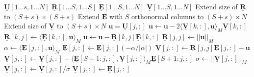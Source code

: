 \begin{algorithmic}
\Require $\mathbf{\underline{U}}[1 \dots s, 1 \dots N]$ 
\Require $\mathbf{\underline{R}}[1 \dots S, 1 \dots S]$  
\Require $\mathbf{\underline{E}}[1 \dots S, 1 \dots N]$ 
\Require $\mathbf{\underline{V}}[1 \dots S, 1 \dots N]$ 
\State Extend size of $\mathbf{\underline{R}}$ to $(S + s) \times (S + s)$
\State Extend $\mathbf{\underline{E}}$ with $S$ orthonormal columns to $(S + s) \times N$
\State Extend size of $\mathbf{\underline{V}}$ to $(S + s) \times N$
    \State $\mathbf{u} = \mathbf{\underline{U}}[j, :]$
        \State $\mathbf{u} \leftarrow \mathbf{u} - 2 \langle \mathbf{\underline{V}}[k, :], \mathbf{u} \rangle_M \mathbf{\underline{V}}[k, :]$
        \State $\mathbf{\underline{R}}[k, j] \leftarrow \langle \mathbf{\underline{E}}[k, :], \mathbf{u} \rangle_M$
        \State $\mathbf{u} \leftarrow \mathbf{u} - \mathbf{\underline{R}}[k, j] \mathbf{\underline{E}}[k, :]$
    \EndFor
    \State $\mathbf{\underline{R}}[j, j] \leftarrow ||\mathbf{u}||_M$
    \State $\alpha \leftarrow \langle \mathbf{\underline{E}}[j, :], \mathbf{u} \rangle_M$
        \State $\mathbf{\underline{E}}[j, :] \leftarrow \mathbf{\underline{E}}[j, :] (-\alpha / |\alpha|)$
    \EndIf 
    \State $\mathbf{\underline{V}}[j, :] \leftarrow \mathbf{\underline{R}}[j, j] \mathbf{\underline{E}}[j, :] - \mathbf{u}$
    \State $\mathbf{\underline{V}}[j, :] \leftarrow \mathbf{\underline{V}}[j, :] - \langle \mathbf{\underline{E}}[S+1:j, :], \mathbf{\underline{V}}[j, :] \rangle_M \mathbf{\underline{E}}[S+1:j, :]$ 
    \State $\sigma \leftarrow ||\mathbf{\underline{V}}[j, :]||_M$
        \State $\mathbf{\underline{V}}[j, :] \leftarrow \mathbf{\underline{V}}[j, :] / \sigma$
    \Else
        \State $\mathbf{\underline{V}}[j, :] \leftarrow \mathbf{\underline{E}}[j, :]$
    \EndIf
\EndFor
\end{algorithmic}